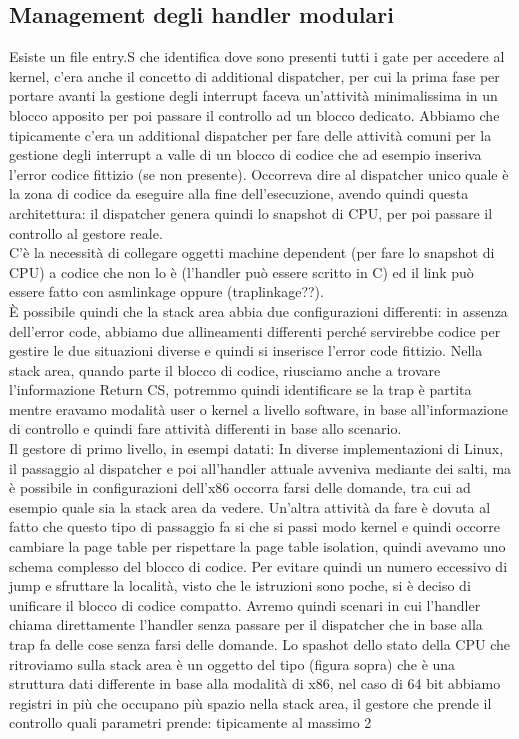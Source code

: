 \documentclass[12pt, oneside]{extbook}
\begin{document}
\subsection{Management degli handler modulari}
Esiste un file entry.S che identifica dove sono presenti tutti i gate per accedere al kernel, c'era anche il concetto di additional dispatcher, per cui la prima fase per portare avanti la gestione degli interrupt faceva un'attività minimalissima in un blocco apposito per poi passare il controllo ad un blocco dedicato. Abbiamo che tipicamente c'era un additional dispatcher per fare delle attività comuni per la gestione degli interrupt a valle di un blocco di codice che ad esempio inseriva l'error codice fittizio (se non presente). Occorreva dire al dispatcher unico quale è la zona di codice da eseguire alla fine dell'esecuzione, avendo quindi questa architettura:
il dispatcher genera quindi lo snapshot di CPU, per poi passare il controllo al gestore reale.\\C'è la necessità di collegare oggetti machine dependent (per fare lo snapshot di CPU) a codice che non lo è (l'handler può essere scritto in C) ed il link può essere fatto con asmlinkage oppure (traplinkage??).\\È possibile quindi che la stack area abbia due configurazioni differenti:
in assenza dell'error code, abbiamo due allineamenti differenti perché servirebbe codice per gestire le due situazioni diverse e quindi si inserisce l'error code fittizio. Nella stack area, quando parte il blocco di codice, riusciamo anche a trovare l'informazione Return CS, potremmo quindi identificare se la trap è partita mentre eravamo modalità user o kernel a livello software, in base all'informazione di controllo e quindi fare attività differenti in base allo scenario.\\Il gestore di primo livello, in esempi datati:
In diverse implementazioni di Linux, il passaggio al dispatcher e poi all'handler attuale avveniva mediante dei salti, ma è possibile in configurazioni dell'x86 occorra farsi delle domande, tra cui ad esempio quale sia la stack area da vedere. Un'altra attività da fare è dovuta al fatto che questo tipo di passaggio fa si che si passi modo kernel e quindi occorre cambiare la page table per rispettare la page table isolation, quindi avevamo uno schema complesso del blocco di codice. Per evitare quindi un numero eccessivo di jump e sfruttare la località, visto che le istruzioni sono poche, si è deciso di unificare il blocco di codice compatto. Avremo quindi scenari in cui l'handler chiama direttamente l'handler senza passare per il dispatcher che in base alla trap fa delle cose senza farsi delle domande. Lo spashot dello stato della CPU che ritroviamo sulla stack area è un oggetto del tipo (figura sopra) che è una struttura dati differente in base alla modalità di x86, nel caso di 64 bit abbiamo registri in più che occupano più spazio nella stack area, il gestore che prende il controllo quali parametri prende: tipicamente al massimo 2
\end{document}
